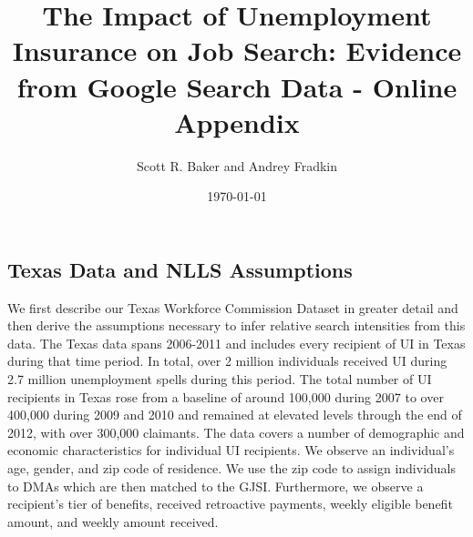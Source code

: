 \documentclass[12pt]{article}
\begin{document}
\title{\vspace{-25mm} The Impact of Unemployment Insurance on Job Search: Evidence from Google Search Data - Online Appendix}

\begin{spacing}{2}

\author{Scott R. Baker and Andrey Fradkin}

\date{\today}
\maketitle

\clearpage


\begin{appendix}
\setcounter{equation}{0}
\setcounter{figure}{0} \renewcommand{\thefigure}{A\arabic{figure}}
\setcounter{table}{0} \renewcommand{\thetable}{A\arabic{table}}
\begin{spacing}{2}

\section{Texas Data and NLLS Assumptions}\label{app:nlls}
We first describe our Texas Workforce Commission Dataset in greater detail and then derive the assumptions necessary to infer relative search intensities from this data. The Texas data spans 2006-2011 and includes every recipient of UI in Texas during that time period. In total, over 2 million individuals received UI during 2.7 million unemployment spells during this period. The total number of UI recipients in Texas rose from a baseline of around 100,000 during 2007 to over 400,000 during 2009 and 2010 and remained at elevated levels through the end of 2012, with over 300,000 claimants. The data covers a number of demographic and economic characteristics for individual UI recipients. We observe an individual's age, gender, and zip code of residence. We use the zip code to assign individuals to DMAs which are then matched to the GJSI. Furthermore, we observe a recipient's tier of benefits, received retroactive payments, weekly eligible benefit amount, and weekly amount received.


\end{spacing}
\end{appendix}
\end{spacing}
\end{document}
